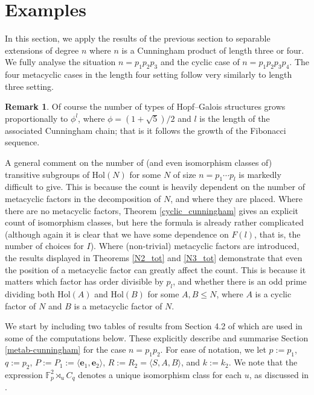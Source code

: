 \documentclass[a4paper,reqno]{amsart}
\theoremstyle{definition}
\newtheorem{remark}[theorem]{Remark}
\newcommand{\e}{\textbf{e}}
\newcommand{\Hol}{\mathrm{Hol}}
\begin{document}
\section{Examples}
In this section, we apply the results of the previous section to separable extensions of degree $n$ where $n$ is a Cunningham product of length three or four. We fully analyse the situation $n=p_1p_2p_3$ and the cyclic case of $n=p_1p_2p_3p_4$. The four metacyclic cases in the length four setting follow very similarly to length three setting.
\begin{remark}
    Of course the number of types of Hopf--Galois structures grows proportionally to $\phi^l$, where $\phi=(1+\sqrt{5})/2$ and $l$ is the length of the associated Cunningham chain; that is it follows the growth of the Fibonacci sequence.
    
    A general comment on the number of (and even isomorphism classes of) transitive subgroups of $\Hol(N)$ for some $N$ of size $n=p_1\cdots p_l$ is markedly difficult to give. This is because the count is heavily dependent on the number of metacyclic factors in the decomposition of $N$, and where they are placed. Where there are no metacyclic factors, Theorem \ref{cyclic_cunningham} gives an explicit count of isomorphism classes, but here the formula is already rather complicated (although again it is clear that we have some dependence on $F(l)$, that is, the number of choices for $I$). Where (non-trivial) metacyclic factors are introduced, the results displayed in Theorems \ref{N2_tot} and \ref{N3_tot} demonstrate that even the position of a metacyclic factor can greatly affect the count. This is because it matters which factor has order divisible by $p_l$, and whether there is an odd prime dividing both $\Hol(A)$ and $\Hol(B)$ for some $A,B \leq N$, where $A$ is a cyclic factor of $N$ and $B$ is a metacyclic factor of $N$.
\end{remark}
We start by including two tables of results from Section 4.2 of \cite{BML21} which are used in some of the computations below. These explicitly describe and summarise Section \ref{metab-cunningham} for the case $n=p_1p_2$. For ease of notation, we let $p:=p_1$, $q:=p_2$, $P:=P_1:=\langle \e_1,\e_2 \rangle$, $R:=R_2=\langle S,A,B \rangle$, and $k:=k_2$. We note that the expression $\mathbb{F}_p^2 \rtimes_u C_q$ denotes a unique isomorphism class for each $u$, as discussed in \cite{BML21}.
\end{document}
